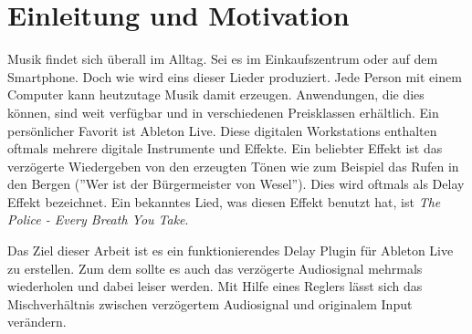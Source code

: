 \chapter{Einleitung und Motivation}

Musik findet sich überall im Alltag. Sei es im Einkaufszentrum oder auf dem Smartphone. Doch wie wird eins dieser Lieder produziert. 
Jede Person mit einem Computer kann heutzutage Musik damit erzeugen. Anwendungen, die dies können, sind weit verfügbar und in verschiedenen Preisklassen erhältlich. Ein persönlicher Favorit ist Ableton Live. Diese digitalen Workstations enthalten oftmals mehrere digitale Instrumente und Effekte. Ein beliebter Effekt ist das verzögerte Wiedergeben von den erzeugten Tönen wie zum Beispiel das Rufen in den Bergen (''Wer ist der Bürgermeister von Wesel''). Dies wird oftmals als Delay Effekt bezeichnet. Ein bekanntes Lied, was diesen Effekt benutzt hat, ist \textit{The Police - Every Breath You Take}.

Das Ziel dieser Arbeit ist es ein funktionierendes Delay Plugin für Ableton Live zu erstellen. Zum dem sollte es auch das verzögerte Audiosignal mehrmals wiederholen und dabei leiser werden. Mit Hilfe eines Reglers lässt sich das Mischverhältnis zwischen verzögertem Audiosignal und originalem Input verändern.